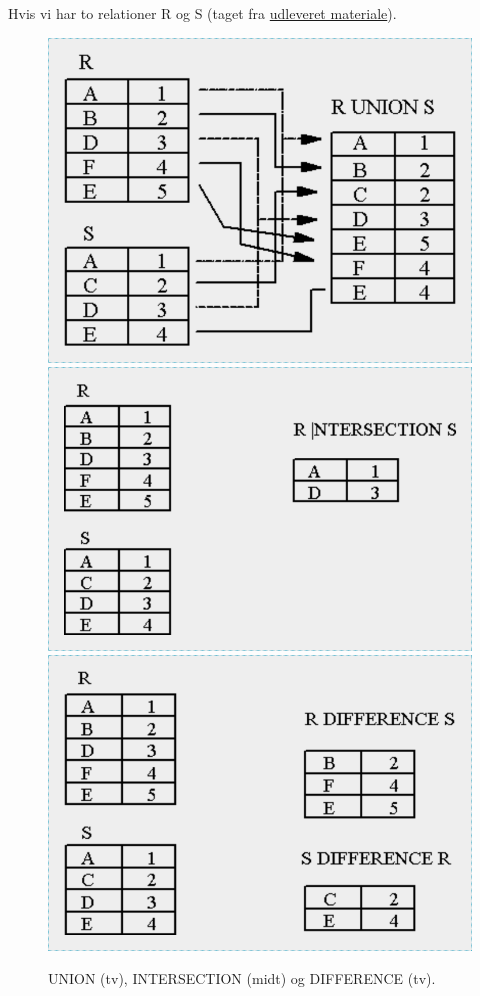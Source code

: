 Hvis vi har to relationer R og S (taget fra \href{http://db.grussell.org/section010.html#_Toc67114476}{udleveret materiale}). 

%	
%	
%	

\begin{figure}[H]
	\centering
	\includegraphics[width=.31\textwidth]{figs/spm6/unionexample}\hfill
	\includegraphics[width=.35\textwidth]{figs/spm6/intersectionexample}\hfill
	\includegraphics[width=.33\textwidth]{figs/spm6/differenceexample}	
	\caption{UNION (tv), INTERSECTION (midt) og DIFFERENCE (tv).}
	\label{fig:union_intersection_difference_example}	
\end{figure}